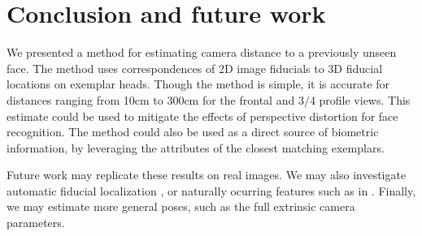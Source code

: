\documentclass[runningheads]{llncs}
\begin{document}
\section{Conclusion and future work} \label{sec:discussion}
We presented a method for estimating camera distance to a previously unseen face.
The method uses correspondences of 2D image fiducials to 3D fiducial locations on exemplar heads.  
Though the method is simple, it is accurate for distances ranging from 10cm to 300cm for the frontal and $3/4$ profile views.  
This estimate could be used to mitigate the effects of perspective distortion for face recognition.
The method could also be used as a direct source of biometric information, by leveraging the attributes of the closest matching exemplars.


Future work may replicate these results on real images.
We may also investigate automatic fiducial localization \cite{belhumeur2011localizing}, or naturally ocurring features such as in \cite{ohayon2006robust}.
Finally, we may estimate more general poses, such as the full extrinsic camera parameters.



\end{document}
